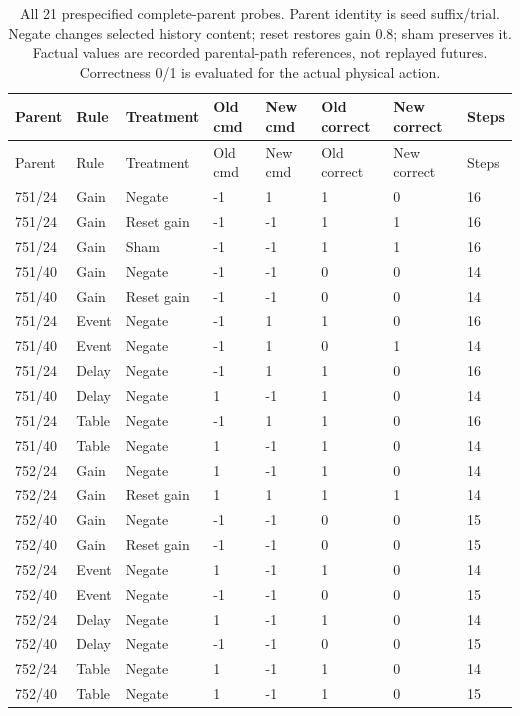 \begin{longtable}{llllllll}
\caption{All 21 prespecified complete-parent probes. Parent identity is seed suffix/trial. Negate changes selected history content; reset restores gain 0.8; sham preserves it. Factual values are recorded parental-path references, not replayed futures. Correctness 0/1 is evaluated for the actual physical action.}\label{tab:local-history-probes}\\
\toprule
Parent & Rule & Treatment & Old cmd & New cmd & Old correct & New correct & Steps \\
\midrule
\endfirsthead
\toprule
Parent & Rule & Treatment & Old cmd & New cmd & Old correct & New correct & Steps \\
\midrule
\endhead
751/24 & Gain & Negate & -1 & 1 & 1 & 0 & 16 \\
751/24 & Gain & Reset gain & -1 & -1 & 1 & 1 & 16 \\
751/24 & Gain & Sham & -1 & -1 & 1 & 1 & 16 \\
751/40 & Gain & Negate & -1 & -1 & 0 & 0 & 14 \\
751/40 & Gain & Reset gain & -1 & -1 & 0 & 0 & 14 \\
751/24 & Event & Negate & -1 & 1 & 1 & 0 & 16 \\
751/40 & Event & Negate & -1 & 1 & 0 & 1 & 14 \\
751/24 & Delay & Negate & -1 & 1 & 1 & 0 & 16 \\
751/40 & Delay & Negate & 1 & -1 & 1 & 0 & 14 \\
751/24 & Table & Negate & -1 & 1 & 1 & 0 & 16 \\
751/40 & Table & Negate & 1 & -1 & 1 & 0 & 14 \\
752/24 & Gain & Negate & 1 & -1 & 1 & 0 & 14 \\
752/24 & Gain & Reset gain & 1 & 1 & 1 & 1 & 14 \\
752/40 & Gain & Negate & -1 & -1 & 0 & 0 & 15 \\
752/40 & Gain & Reset gain & -1 & -1 & 0 & 0 & 15 \\
752/24 & Event & Negate & 1 & -1 & 1 & 0 & 14 \\
752/40 & Event & Negate & -1 & -1 & 0 & 0 & 15 \\
752/24 & Delay & Negate & 1 & -1 & 1 & 0 & 14 \\
752/40 & Delay & Negate & -1 & -1 & 0 & 0 & 15 \\
752/24 & Table & Negate & 1 & -1 & 1 & 0 & 14 \\
752/40 & Table & Negate & 1 & -1 & 1 & 0 & 15 \\
\bottomrule
\end{longtable}
